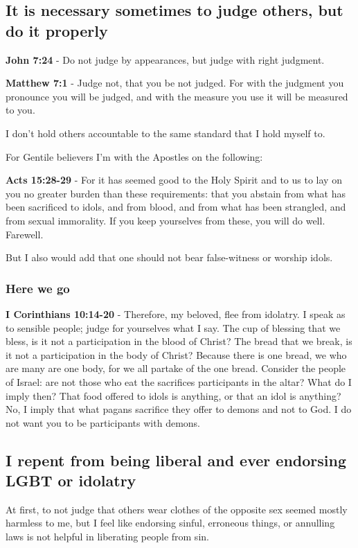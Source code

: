 \documentclass[11pt]{article}
\begin{document}
\subsection{It is necessary sometimes to judge others, but do it properly}
\label{sec:orgcf78bf2}
\textbf{John 7:24} - Do not judge by appearances, but judge with right judgment.

\textbf{Matthew 7:1} - Judge not, that you be not judged.  For with the judgment you pronounce you will be judged, and with the measure you use it will be measured to you.

I don't hold others accountable to the same standard that I hold myself to.

For Gentile believers I'm with the Apostles on the following:

\textbf{Acts 15:28-29} - For it has seemed good to the Holy Spirit and to us to lay on you no greater burden than these requirements: that you abstain from what has been sacrificed to idols, and from blood, and from what has been strangled, and from sexual immorality. If you keep yourselves from these, you will do well. Farewell.

But I also would add that one should not bear false-witness or worship idols.

\subsubsection{Here we go}
\label{sec:orgb5835b8}
\textbf{I Corinthians 10:14-20} - Therefore, my beloved, flee from idolatry.  I speak as to sensible people; judge for yourselves what I say.  The cup of blessing that we bless, is it not a participation in the blood of Christ? The bread that we break, is it not a participation in the body of Christ?  Because there is one bread, we who are many are one body, for we all partake of the one bread.  Consider the people of Israel: are not those who eat the sacrifices participants in the altar?  What do I imply then? That food offered to idols is anything, or that an idol is anything?  No, I imply that what pagans sacrifice they offer to demons and not to God. I do not want you to be participants with demons.

\subsection{I repent from being liberal and ever endorsing LGBT or idolatry}
\label{sec:orgf44bb5d}
At first, to not judge that others wear
clothes of the opposite sex seemed mostly
harmless to me, but I feel like endorsing
sinful, erroneous things, or annulling laws
is not helpful in liberating people from sin.
\end{document}
